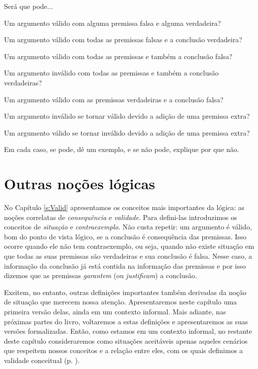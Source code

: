 \problempart
\label{pr.EnglishCombinations}
Será que pode...
	\begin{earg}
		\item Um argumento válido com alguma premissa falsa e alguma verdadeira?
		\item Um argumento válido com todas as premissas falsas e a conclusão verdadeira?
		\item Um argumento válido com todas as premissas e também a conclusão falsa?
		\item Um argumento inválido com todas as premissas e também a conclusão verdadeiras?
		\item Um argumento válido com as premissas verdadeiras e a conclusão falsa?
		\item Um argumento inválido se tornar válido devido a adição de uma premissa extra?
		\item Um argumento válido se tornar inválido devido a adição de uma premissa extra?
	\end{earg}
Em cada caso, se pode, dê um exemplo, e se não pode, explique por que não.


\chapter{Outras noções lógicas}\label{s:BasicNotions}

No Capítulo \ref{s:Valid} apresentamos os conceitos mais importantes da lógica:
as noções correlatas de \textit{consequência} e  \textit{validade}.
Para defini-las introduzimos os conceitos de \textit{situação} e \textit{contraexemplo}. 
Não custa repetir:
um argumento é válido, bom do ponto de vista lógico, se a conclusão é consequência das premissas.
Isso ocorre  quando ele não tem contraexemplo, ou seja, quando não existe situação em que todas as suas premissas são verdadeiras e sua conclusão é falsa.
Nesse caso, a informação da conclusão já está contida na informação das premissas e por isso dizemos que as premissas \textit{garantem} (ou \textit{justificam}) a conclusão.

Exsitem, no entanto, outras definições importantes também derivadas da noção de situação que merecem nossa atenção.
Apresentaremos neste capítulo uma primeira versão delas, ainda em um contexto informal. Mais adiante, nas próximas partes do livro, voltaremos a estas definições e apresentaremos as suas versões formalizadas.
Então, como estamos em um contexto informal, no restante deste capítulo consideraremos como situações aceitáveis apenas aqueles cenários que respeitem nossos conceitos e a relação entre eles, com os quais definimos a validade conceitual (p. \pageref{nomoval}).

